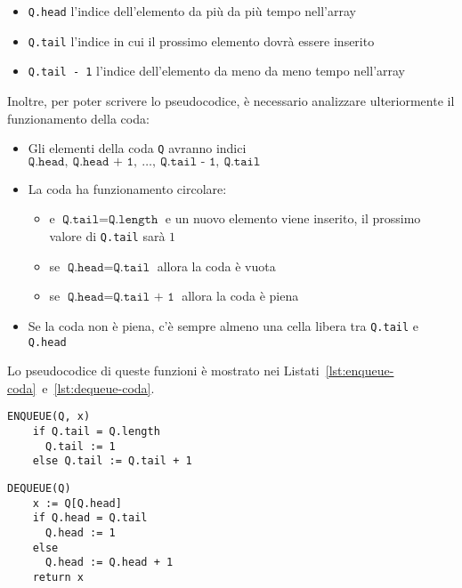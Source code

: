 \documentclass[italian, 10pt]{article}
\begin{document}
\begin{itemize}
  \item \texttt{Q.head} l'indice dell'elemento da più da più tempo nell'array
  \item \texttt{Q.tail} l'indice in cui il prossimo elemento dovrà essere inserito
  \item \texttt{Q.tail - 1} l'indice dell'elemento da meno da meno tempo nell'array
\end{itemize}

Inoltre, per poter scrivere lo pseudocodice, è necessario analizzare ulteriormente il funzionamento della coda:

\begin{itemize}
  \item Gli elementi della coda \texttt{Q} avranno indici \(\texttt{Q.head},\ \texttt{Q.head + 1},\ \ldots,\ \texttt{Q.tail - 1},\ \texttt{Q.tail}\)
  \item La coda ha funzionamento circolare:
        \begin{itemize}
          \item e \(\texttt{Q.tail} = \texttt{Q.length}\) e un nuovo elemento viene inserito, il prossimo valore di \texttt{Q.tail} sarà \(1\)
          \item se \(\texttt{Q.head} = \texttt{Q.tail}\) allora la coda è vuota
          \item se \(\texttt{Q.head} = \texttt{Q.tail + 1}\) allora la coda è piena
        \end{itemize}
  \item Se la coda non è piena, c'è sempre almeno una cella libera tra \texttt{Q.tail} e \texttt{Q.head}
\end{itemize}

\bigskip
Lo pseudocodice di queste funzioni è mostrato nei Listati~\ref{lst:enqueue-coda}~e~\ref{lst:dequeue-coda}.

\begin{minipage}[t]{0.495\textwidth}
  \begin{lstlisting}[style=pseudocode, caption={\texttt{ENQUEUE} in coda}, label={lst:enqueue-coda}]
ENQUEUE(Q, x)
    if Q.tail = Q.length
      Q.tail := 1
    else Q.tail := Q.tail + 1
  \end{lstlisting}
\end{minipage}
\begin{minipage}[t]{0.495\textwidth}
  \begin{lstlisting}[style=pseudocode, caption={\texttt{DEQUEUE} in coda}, label={lst:dequeue-coda}]
DEQUEUE(Q)
    x := Q[Q.head]
    if Q.head = Q.tail
      Q.head := 1
    else
      Q.head := Q.head + 1
    return x
  \end{lstlisting}
\end{minipage}
\end{document}
